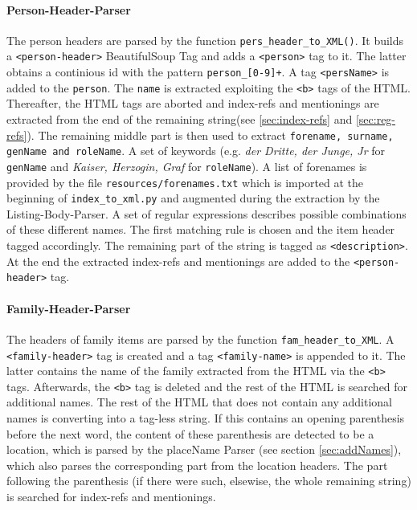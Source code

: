 \paragraph{Person-Header-Parser}
The person headers are parsed by the function \texttt{pers\_header\_to\_XML()}. It builds a \texttt{<person-header>} BeautifulSoup Tag and adds a \texttt{<person>} tag to it. The latter obtains a continious id with the pattern \texttt{person\_[0-9]+}. A tag \texttt{<persName>} is added to the \texttt{person}. The \texttt{name} is extracted exploiting the \texttt{<b>} tags of the HTML. Thereafter, the HTML tags are aborted and index-refs and mentionings are extracted from the end of the remaining string(see \ref{sec:index-refs} and \ref{sec:reg-refs}). The remaining middle part is then used to extract \texttt{forename, surname, genName and roleName}. A set of keywords (e.g. \textit{der Dritte, der Junge, Jr} for \texttt{genName} and \textit{Kaiser, Herzogin, Graf} for \texttt{roleName}). A list of forenames is provided by the file \texttt{resources/forenames.txt} which is imported at the beginning of \texttt{index\_to\_xml.py} and augmented during the extraction by the Listing-Body-Parser. A set of regular expressions describes possible combinations of these different names. The first matching rule is chosen and the item header tagged accordingly. The remaining part of the string is tagged as \texttt{<description>}. At the end the extracted index-refs and mentionings are added to the \texttt{<person-header>} tag.

\paragraph{Family-Header-Parser}
The headers of family items are parsed by the function \texttt{fam\_header\_to\_XML}. A \texttt{<family-header>} tag is created and a tag \texttt{<family-name>} is appended to it. The latter contains the name of the family extracted from the HTML via the \texttt{<b>} tags. Afterwards, the \texttt{<b>} tag is deleted and the rest of the HTML is searched for additional names. The rest of the HTML that does not contain any additional names is converting into a tag-less string. If this contains an opening parenthesis before the next word, the content of these parenthesis are detected to be a location, which is parsed by the placeName Parser (see section \ref{sec:addNames}), which also parses the corresponding part from the location headers. The part following the parenthesis (if there were such, elsewise, the whole remaining string) is searched for index-refs and mentionings.

